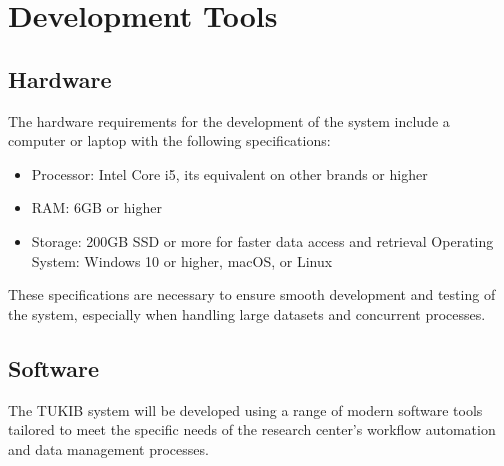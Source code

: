\section{Development Tools}

\subsection{Hardware}

The hardware requirements for the development of the system include a computer or laptop with the following specifications:

\begin{itemize}
	\item Processor: Intel Core i5, its equivalent on other brands or higher
	\item RAM: 6GB or higher
	\item Storage: 200GB SSD or more for faster data access and retrieval
	Operating System: Windows 10 or higher, macOS, or Linux
\end{itemize}

These specifications are necessary to ensure smooth development and testing of the system, especially when handling large datasets and concurrent processes.

\subsection{Software}

The TUKIB system will be developed using a range of modern software tools tailored to meet the specific needs of the research center’s workflow automation and data management processes.

